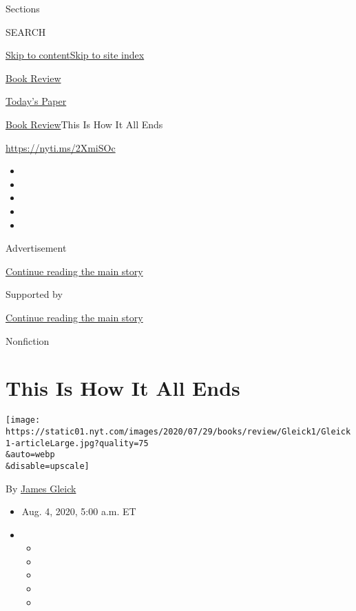Sections

SEARCH

\protect\hyperlink{site-content}{Skip to
content}\protect\hyperlink{site-index}{Skip to site index}

\href{https://www.nytimes.com/section/books/review}{Book Review}

\href{https://myaccount.nytimes.com/auth/login?response_type=cookie\&client_id=vi}{}

\href{https://www.nytimes.com/section/todayspaper}{Today's Paper}

\href{/section/books/review}{Book Review}\textbar{}This Is How It All
Ends

\url{https://nyti.ms/2XmiSOc}

\begin{itemize}
\item
\item
\item
\item
\item
\end{itemize}

Advertisement

\protect\hyperlink{after-top}{Continue reading the main story}

Supported by

\protect\hyperlink{after-sponsor}{Continue reading the main story}

Nonfiction

\hypertarget{this-is-how-it-all-ends}{%
\section{This Is How It All Ends}\label{this-is-how-it-all-ends}}

\texttt{[image: https://static01.nyt.com/images/2020/07/29/books/review/Gleick1/Gleick1-articleLarge.jpg?quality=75\\\&auto=webp\\\&disable=upscale]}

By \href{https://www.nytimes.com/by/james-gleick}{James Gleick}

\begin{itemize}
\item
  Aug. 4, 2020, 5:00 a.m. ET
\item
  \begin{itemize}
  \item
  \item
  \item
  \item
  \item
  \end{itemize}
\end{itemize}

